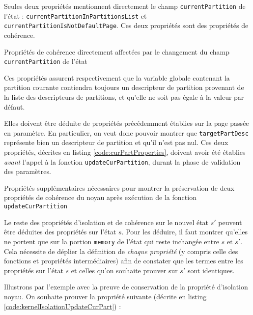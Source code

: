 			Seules deux propriétés mentionnent directement le champ \texttt{currentPartition} de l'état : \texttt{currentPartitionInPartitionsList} et \texttt{currentPartitionIsNotDefaultPage}. Ces deux propriétés sont des propriétés de cohérence.

			\begin{listing}[!ht]
				\caption{Propriétés de cohérence directement affectées par le changement du champ \texttt{currentPartition} de l'état}
				\label{code:consistencyCurPart}
			\end{listing}

			Ces propriétés assurent respectivement que la variable globale contenant la partition courante contiendra toujours un descripteur de partition provenant de la liste des descripteurs de partitions, et qu'elle ne soit pas égale à la valeur par défaut.

			Elles doivent être déduite de propriétés précédemment établies sur la page passée en paramètre. En particulier, on veut donc pouvoir montrer que \texttt{targetPartDesc} représente bien un descripteur de partition et qu'il n'est pas nul. Ces deux propriétés, décrites en listing \ref{code:curPartProperties}, doivent avoir été établies \emph{avant} l'appel à la fonction \texttt{updateCurPartition}, durant la phase de validation des paramètres.

			\begin{listing}[!ht]
				\caption{Propriétés supplémentaires nécessaires pour montrer la préservation de deux propriétés de cohérence du noyau après exécution de la fonction \texttt{updateCurPartition}}
				\label{code:curPartProperties}
			\end{listing}

			Le reste des propriétés d'isolation et de cohérence sur le nouvel état $s'$ peuvent être déduites des propriétés sur l'état $s$. Pour les déduire, il faut montrer qu'elles ne portent que sur la portion \texttt{memory} de l'état qui reste inchangée entre $s$ et $s'$. Cela nécessite de déplier la définition de \emph{chaque propriété} (y compris celle des fonctions et propriétés intermédiaires) afin de constater que les termes entre les propriétés sur l'état $s$ et celles qu'on souhaite prouver sur $s'$ sont identiques.

			Illustrons par l'exemple avec la preuve de conservation de la propriété d'isolation noyau. On souhaite prouver la propriété suivante (décrite en listing \ref{code:kernelIsolationUpdateCurPart}) : 

